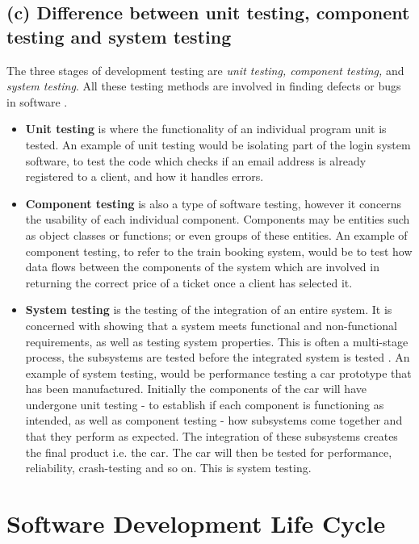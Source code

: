 \documentclass{article}
\begin{document}
\subsection{(c) Difference between unit testing, component testing and system testing}
\begin{flushleft}
The three stages of development testing are \textit{unit testing, component testing,} and \textit{system testing}. All these testing methods are involved in finding defects or bugs in software \cite{sommerville2016software}.
\end{flushleft}
\begin{itemize}
	\item \textbf{Unit testing} is where the functionality of an individual program unit is tested. An example of unit testing would be isolating part of the login system software, to test the code which checks if an email address is already registered to a client, and how it handles errors.
	\item \textbf{Component testing} is also a type of software testing, however it concerns the usability of each individual component. Components may be entities such as object classes or functions; or even groups of these entities. An example of component testing, to refer to the train booking system, would be to test how data flows between the components of the system which are involved in returning the correct price of a ticket once a client has selected it.
	\item \textbf{System testing} is the testing of the integration of an entire system. It is concerned with showing that a system meets functional and non-functional requirements, as well as testing system properties. This is often a multi-stage process, the subsystems are tested before the integrated system is tested \cite{sommerville2016software}. An example of system testing, would be performance testing a car prototype that has been manufactured. Initially the components of the car will have undergone unit testing - to establish if each component is functioning as intended, as well as component testing - how subsystems come together and that they perform as expected. The integration of these subsystems creates the final product i.e. the car. The car will then be tested for performance, reliability, crash-testing and so on. This is system testing.
\end{itemize}

\newpage
\section{Software Development Life Cycle}
\end{document}
